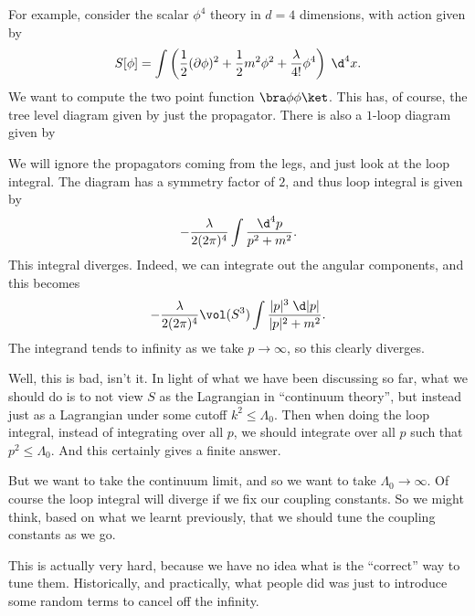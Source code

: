 \documentclass[a4paper]{article}
\begin{document}
For example, consider the scalar $\phi^4$ theory in $d = 4$ dimensions, with action given by
\[
  S[\phi] = \int \left(\frac{1}{2}(\partial \phi)^2 + \frac{1}{2} m^2 \phi^2 + \frac{\lambda}{4!} \phi^4\right)\;\d^4 x.
\]
We want to compute the two point function $\bra \phi \phi\ket$. This has, of course, the tree level diagram given by just the propagator. There is also a $1$-loop diagram given by
\begin{center}
\end{center}
We will ignore the propagators coming from the legs, and just look at the loop integral. The diagram has a symmetry factor of $2$, and thus loop integral is given by
\[
  -\frac{\lambda}{2(2\pi)^4} \int \frac{\d^4 p}{p^2 + m^2}.
\]
This integral diverges. Indeed, we can integrate out the angular components, and this becomes
\[
  - \frac{\lambda}{2(2\pi)^4} \vol(S^3) \int \frac{|p|^3\; \d |p|}{|p|^2 + m^2}.
\]
The integrand tends to infinity as we take $p \to \infty$, so this clearly diverges.

Well, this is bad, isn't it. In light of what we have been discussing so far, what we should do is to not view $S$ as the Lagrangian in ``continuum theory'', but instead just as a Lagrangian under some cutoff $k^2 \leq \Lambda_0$. Then when doing the loop integral, instead of integrating over all $p$, we should integrate over all $p$ such that $p^2 \leq \Lambda_0$. And this certainly gives a finite answer.

But we want to take the continuum limit, and so we want to take $\Lambda_0 \to \infty$. Of course the loop integral will diverge if we fix our coupling constants. So we might think, based on what we learnt previously, that we should tune the coupling constants as we go.

This is actually very hard, because we have no idea what is the ``correct'' way to tune them. Historically, and practically, what people did was just to introduce some random terms to cancel off the infinity.
\end{document}
